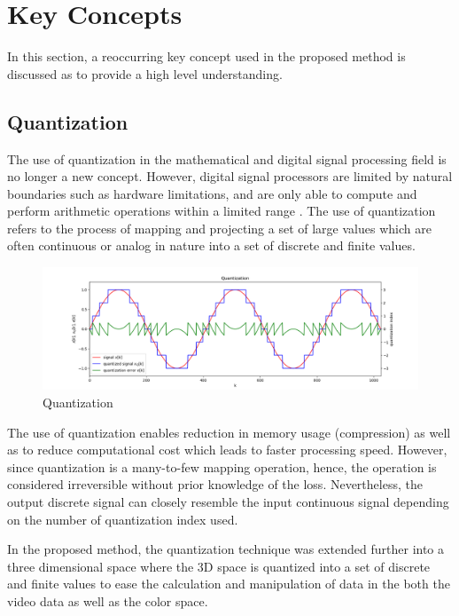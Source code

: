 \section{Key Concepts}
\label{section:keyconcepts}
In this section, a reoccurring key concept used in the proposed method is discussed as to provide a high level understanding. 



\subsection{Quantization}

The use of quantization in the mathematical and digital signal processing field is no longer a new concept. However, digital signal processors are limited by natural boundaries such as hardware limitations, and are only able to compute and perform arithmetic operations within a limited range \cite{spors_2018}. The use of quantization refers to the process of mapping and projecting a set of large values which are often continuous or analog in nature into a set of discrete and finite values. 

\begin{figure}[hbt!]\centering
\includegraphics[width=\textwidth]{image/general/quantization.png}
\caption{Quantization}
\end{figure}


The use of quantization enables reduction in memory usage (compression) as well as to reduce computational cost which leads to faster processing speed. However, since quantization is a many-to-few mapping operation, hence, the operation is considered irreversible without prior knowledge of the loss. Nevertheless, the output discrete signal can closely resemble the input continuous signal depending on the number of quantization index used.   

In the proposed method, the quantization technique was extended further into a three dimensional space where the 3D space is quantized into a set of discrete and finite values to ease the calculation and manipulation of data in the both the video data as well as the color space. 

